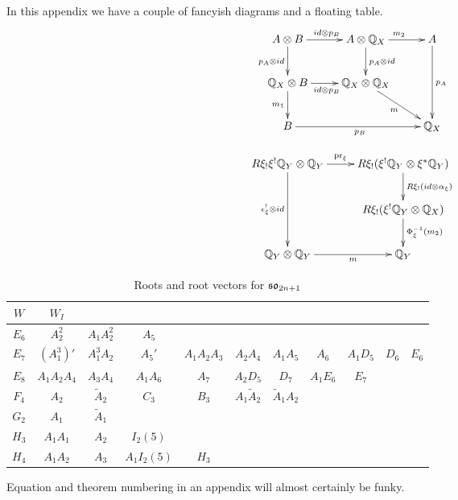 
\appchapter{\MyChapTwo}\label{appchap-two}




In this appendix we have a couple of fancyish diagrams and a floating table.
\[
\xymatrix{A\otimes B \ar[r]^{\id\otimes p_B} \ar[d]_{ p_A\otimes \id} &
  A\otimes \BBQ_X \ar[r]^{m_2} \ar[d]^{p_A\otimes \id} &A
  \ar[dd] ^{p_A} \\
  \BBQ_X\otimes B\ar[r]_{\id\otimes p_B} \ar[d]_{m_1} &\BBQ_X
  \otimes \BBQ_X \ar[rd]_m & \\
  B\ar[rr]_{p_B} &&\BBQ_X}
\]

\[
\xymatrix{R\xi_! \xi^! \BBQ_Y \otimes \BBQ_Y \ar[r]^-{\pr_\xi} \ar[dd]
  _{\epsilon_\xi^! \otimes \id}& R\xi_!( \xi^!
  \BBQ_Y \otimes \xi^* \BBQ_Y ) \ar[d]^{R\xi_!(\id\otimes \alpha_\xi)} \\
  & R\xi_!( \xi^! \BBQ_Y \otimes \BBQ_X ) \ar[d]
  ^{\Phi_\xi\inverse (m_2)} \\
  \BBQ_Y \otimes \BBQ_Y \ar[r]_-{m} &\BBQ_Y }
\]


\begin{table}[h!tb]
  \caption{Roots and root vectors for $\mathfrak {so}_{2n+1}$}\label{atab:soodd}
  \begin{tabular}{c|cccccccccc}
    $W$ & $W_I$ \\
    \hline
    \hline
    $E_6$ & $A_2^2$ & $A_1 A_2^2$ & $A_5$ \\
    $E_7$ &  $(A_1^3)'$ & $A_1^3 A_2$ & $A_5'$ & $A_1 A_2
    A_3$ & $A_2 A_4$ & $A_1 A_5$ &  $A_6$ & $A_1 D_5$ & $D_6$ &
    $E_6$ \\ 
    $E_8$ &  $A_1 A_2 A_4$ & $A_3 A_4$ & $A_1 A_6$ & $A_7$ & $A_2 D_5$ &
    $D_7$ & $A_1 E_6$ & $E_7$ \\ 
    $F_4$ &  $A_2$ & $\widetilde A_2$ & $C_3$ & $B_3$ & $A_1 \widetilde
    A_2$ & $\widetilde A_1 A_2$  \\ 
    $G_2$ & $A_1$ & $\widetilde A_1$ \\
    $H_3$ & $A_1A_1$ & $A_2$ &$I_2(5)$ \\
    $H_4$ & $A_1A_2$ & $A_3$ &$A_1I_2(5)$ &$H_3$\\
  \end{tabular}
\end{table}

Equation and theorem numbering in an appendix will almost certainly be
funky.

